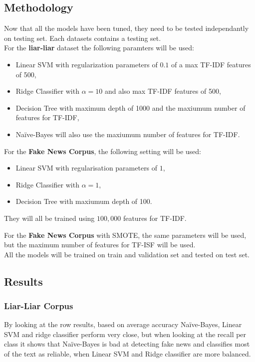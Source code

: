 \subsection{Methodology}
Now that all the models have been tuned, they need to be tested independantly on testing set. Each datasets contains a testing set. \\

For the \textbf{liar-liar} dataset the following paramters will be used:
\begin{itemize}
	\item Linear SVM with regularization parameters of $0.1$ of a max TF-IDF features of 500,
	\item Ridge Classifier with $\alpha = 10$ and also max TF-IDF features of 500,
	\item Decision Tree with maximum depth of 1000 and the maxiumum number of features for TF-IDF,
	\item Naïve-Bayes will also use the maxiumum number of features for TF-IDF.
\end{itemize}

For the \textbf{Fake News Corpus}, the following setting will be used:
\begin{itemize}
	\item Linear SVM with regularisation parameters of $1$,
	\item Ridge Classifier with $\alpha = 1$,
	\item Decision Tree with maxiumum depth of 100.
\end{itemize}

They will all be trained using $100,000$ features for TF-IDF.

For the \textbf{Fake News Corpus} with SMOTE, the same parameters will be used, but the maximum number of features for TF-ISF will be used.\\

All the models will be trained on train and validation set and tested on test set. 

\subsection{Results}
\subsubsection{Liar-Liar Corpus}
By looking at the row results, based on average accuracy Naïve-Bayes, Linear SVM and ridge classifier perform very close, but when looking at the recall per class it shows that Naïve-Bayes is bad at detecting fake news and classifies most of the text as reliable, when Linear SVM and Ridge classifier are more balanced. 

